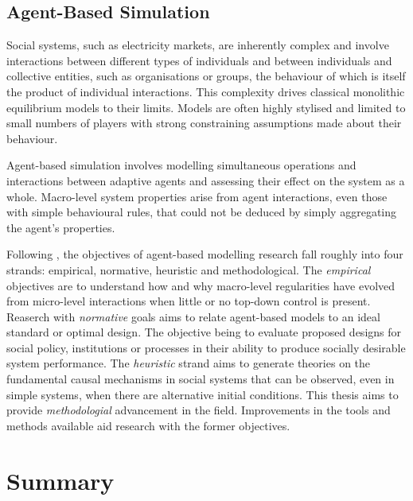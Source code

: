 \subsection{Agent-Based Simulation}
Social systems, such as electricity markets, are inherently complex and involve
interactions between different types of individuals and between individuals
and collective entities, such as organisations or groups, the behaviour of which
is itself the product of individual interactions.  This complexity
drives classical monolithic equilibrium models to their limits.  Models are
often highly stylised and limited to small numbers of players with strong
constraining assumptions made about their behaviour.

Agent-based simulation involves modelling simultaneous operations and
interactions between adaptive agents and assessing their effect on the system
as a whole.  Macro-level system properties arise from agent interactions, even
those with simple behavioural rules, that could not be deduced by simply
aggregating the agent's properties. %

Following \cite{tesfatsi:handbook}, the objectives of agent-based modelling
research fall roughly into four strands: empirical, normative, heuristic and
methodological. The \textit{empirical} objectives are to understand how and why macro-level
regularities have evolved from micro-level interactions when little or no
top-down control is present.  Reaserch with \textit{normative} goals aims to
relate agent-based models to an ideal standard or optimal design.  The objective being
to evaluate proposed designs for social policy, institutions or processes in
their ability to produce socially desirable system performance.  The
\textit{heuristic} strand aims to generate theories on the fundamental causal
mechanisms in social systems that can be observed, even in simple systems, when there are
alternative initial conditions.  This thesis aims to provide
\textit{methodologial} advancement in the field.  Improvements in the tools
and methods available aid research with the former objectives.

\section{Summary}

